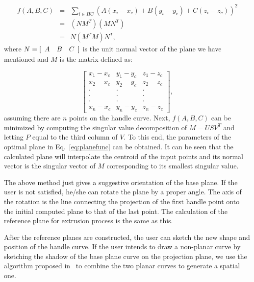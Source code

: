 \begin{eqnarray}
\label{eq:planeobjnew}
    f(A,B,C) &=& \sum\limits_{i \in HC} {(A(x_i-x_c)+B(y_i-y_c)+C(z_i-z_c))^2}\nonumber\\
    &=& (NM^T)(MN^T)\nonumber\\
    &=& N (M^TM) N^T,
\end{eqnarray}
where $N = [\begin{array}{*{20}c} A & B & C \end{array}]$
is the unit normal vector of the plane we have mentioned
and $M$ is the matrix defined as:

\begin{equation*}
\begin{bmatrix}
x_1-x_c & y_1-y_c & z_1-z_c\\[-1em]
x_2-x_c & y_2-y_c & z_2-z_c\\[-1em]
\cdot & \cdot & \cdot\\[-1em]
\cdot & \cdot & \cdot\\[-1em]
\cdot & \cdot & \cdot\\[-1em]
x_n-x_c & y_n-y_c & z_n-z_c
\end{bmatrix},
\end{equation*}
assuming there are $n$ points on the handle curve. Next, $f(A,B,C)$
can be minimized by computing the singular value decomposition
of $M=USV^T$ and letting $P$ equal to the third column
of $V$. To this end, the parameters of the optimal plane in
Eq.~\ref{eq:planefunc} can be obtained. It can be seen that
the calculated plane will interpolate the centroid of the
input points and its normal vector is the singular vector
of $M$ corresponding to its smallest singular value.



The above method just gives a suggestive orientation of the base
plane. If the user is not satisfied, he/she can rotate the plane by
a proper angle. The axis of the rotation is the line connecting the
projection of the first handle point onto the initial computed plane
to that of the last point. The calculation of the reference plane
for extrusion process is the same as this.

After the reference planes are constructed, the user can sketch the
new shape and position of the handle curve. If the user intends to
draw a non-planar curve by sketching the shadow of the base plane
curve on the projection plane, we use the algorithm proposed
in~\cite{CMZHB99} to combine the two planar curves to generate a
spatial one.

